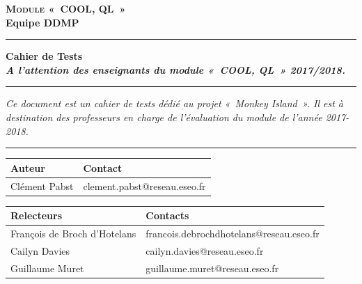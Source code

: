 \documentclass[a4paper,11pt,titlepage]{article}
\newcommand{\TypeDocument}{Cahier de Tests}
\newcommand{\AuteurPrincipal}{Clément Pabst}
\newcommand{\NomGroupeDocument}{Equipe DDMP}
\newcommand{\IntituleDocument}{Module «~COOL, QL~»}
\newcommand{\PorteeDocument}{A l'attention des enseignants du module «~COOL, QL~» 2017/2018.}
\begin{document}
\setlength\parindent{0pt}
\sloppy%
\renewcommand{\arraystretch}{1.5}


\vspace{-2cm}%
\begin{center}%
{\Large {\textsc{\bf \IntituleDocument}}}
\vspace{0.4cm}\\
{\large\bf \NomGroupeDocument}

\rule[0.5ex]{0.52\textwidth}{0.1mm}

\vspace{0.2cm}
{\Large\bf{\TypeDocument}}
\vspace{0.2cm}\\
{\Large\bf\textit{\PorteeDocument}}
\end{center}

\vspace{-0.2cm}
\noindent\rule[0.5ex]{\textwidth}{0.1mm}
\textit{Ce document est un cahier de tests dédié au projet «~Monkey Island~». Il est à destination des professeurs en charge de l'évaluation du module de l'année 2017-2018.}\\
\rule[0.5ex]{\textwidth}{0.1mm}

\vspace{1cm}
\begin{tabular}{|p{5cm}|p{9cm}|}
\hline
\textbf{Auteur} & \textbf{Contact} \\\hline
\AuteurPrincipal & clement.pabst@reseau.eseo.fr\\\hline
\end{tabular}

\vspace{0.5cm}
\begin{tabular}{|p{5cm}|p{9cm}|}\hline
\textbf{Relecteurs} & \textbf{Contacts} \\\hline
François de Broch d'Hotelans & francois.debrochdhotelans@reseau.eseo.fr\\\hline
Cailyn Davies & cailyn.davies@reseau.eseo.fr\\\hline
Guillaume Muret & guillaume.muret@reseau.eseo.fr\\\hline
\end{tabular}

\newpage
\end{document}
